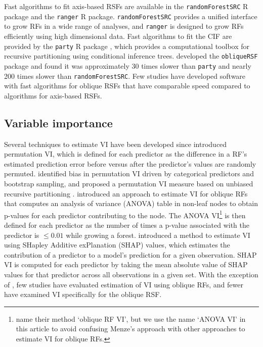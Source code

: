 \documentclass[12pt]{article}\usepackage[]{graphicx}\usepackage[]{xcolor}
\begin{document}
Fast algorithms to fit axis-based RSFs are available in the \texttt{randomForestSRC} R package \citep{randomForestSRC} and the \texttt{ranger} \citep{ranger} R package. \texttt{randomForestSRC} provides a unified interface to grow RFs in a wide range of analyses, and \texttt{ranger} is designed to grow RFs efficiently using high dimensional data. Fast algorithms to fit the CIF are provided by the \texttt{party} R package \citep{hothorn2010party}, which provides a computational toolbox for recursive partitioning using conditional inference trees. \citet{jaeger2019oblique} developed the \texttt{obliqueRSF} package and found it was approximately 30 times slower than \texttt{party} and nearly 200 times slower than \texttt{randomForestSRC}. Few studies have developed software with fast algorithms for oblique RSFs that have comparable speed compared to algorithms for axis-based RSFs.

\subsection{Variable importance} \label{sec:rw_vi}

Several techniques to estimate VI have been developed since \citet{breiman2001random} introduced permutation VI, which is defined for each predictor as the difference in a RF's estimated prediction error before versus after the predictor's values are randomly permuted. \citet{strobl2007bias} identified bias in permutation VI driven by categorical predictors and bootstrap sampling, and proposed a permutation VI measure based on unbiased recursive partitioning \citep{hothorn2006unbiased}. \citet{menze2011oblique} introduced an approach to estimate VI for oblique RFs that computes an analysis of variance (ANOVA) table in non-leaf nodes to obtain p-values for each predictor contributing to the node. The ANOVA VI\footnote{\citet{menze2011oblique} name their method `oblique RF VI', but we use the name `ANOVA VI' in this article to avoid confusing Menze's approach with other approaches to estimate VI for oblique RFs.} is then defined for each predictor as the number of times a p-value associated with the predictor is $\leq 0.01$ while growing a forest. \citet{lundberg2017unified} introduced a method to estimate VI using SHapley Additive exPlanation (SHAP) values, which estimates the contribution of a predictor to a model's prediction for a given observation. SHAP VI is computed for each predictor by taking the mean absolute value of SHAP values for that predictor across all observations in a given set. With the exception of \citet{menze2011oblique}, few studies have evaluated estimation of VI using oblique RFs, and fewer have examined VI specifically for the oblique RSF.
\end{document}
